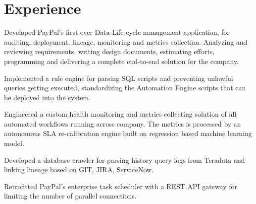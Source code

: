 \documentclass[]{kushal-resume}
\begin{document}
\hfill
\begin{minipage}[t]{0.66\textwidth}
	

\section{Experience}

\vspace{\topsep}
\begin{tightemize}\item Developed PayPal's first ever Data Life-cycle management application, for auditing, deployment, lineage, monitoring and metrics collection.
Analyzing and reviewing requirements, writing design documents, estimating efforts, programming and delivering a complete end-to-end solution for the company.
\item Implemented a rule engine for parsing SQL scripts and preventing unlawful queries getting executed, standardizing the Automation Engine scripts that can be deployed into the system.
\item Engineered a custom health monitoring and metrics collecting  solution of all automated workflows running across company.
The metrics is processed by an autonomous SLA re-calibration engine built on regression based machine learning model.
\item Developed a database crawler for parsing history query logs from Teradata and linking lineage based on GIT, JIRA, ServiceNow.
\item Retrofitted PayPal's enterprise task scheduler with a REST API gateway for limiting the number of parallel connections.
\end{tightemize}
\sectionsep


\end{minipage}
\end{document}
